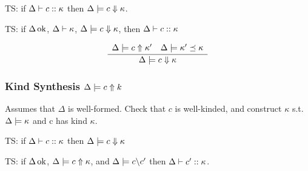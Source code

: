 \documentclass[12pt,twoside,fleqn]{amsart}
\theoremstyle{plain}
\theoremstyle{plain}
\theoremstyle{definition}
\begin{document}
TS: if \( \Delta  \vdash c  ::\kappa   \) then \( \Delta  \models c \Downarrow \kappa  \).

TS: if \( \Delta  \, \mathrm{ok} \), \( \Delta  \vdash \kappa   \), \( \Delta  \models c \Downarrow \kappa  \),
then \( \Delta  \vdash c  ::\kappa   \)


\[
\frac{\begin{array}{ll}
\Delta  \models c \Uparrow \kappa ' & \Delta  \models \kappa ' \preceq \kappa 
\end{array} }{\Delta  \models c \Downarrow \kappa  }\]



\subsubsection{Kind Synthesis \protect\( \Delta  \models c \Uparrow k\protect \)}

Assumes that \( \Delta  \) is well-formed. Check that \( c \) is well-kinded,
and construct \( \kappa  \) s.t. \( \Delta  \models \kappa  \) and c
has kind \( \kappa  \). 

TS: if \( \Delta  \vdash c ::\kappa  \) then \( \Delta  \models c \Downarrow \kappa  \)

TS: if \( \Delta  \, \mathrm{ok} \), \( \Delta  \models c \Uparrow \kappa  \),
and \( \Delta  \models c \backslash c' \) then \( \Delta  \vdash c'  ::\kappa   \).
\end{document}
